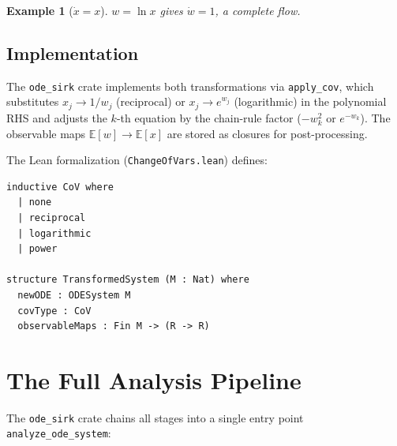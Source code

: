 \documentclass[11pt,a4paper]{article}
\newtheorem{example}{Example}
\newcommand{\Eset}{\mathbb{E}}
\begin{document}
\begin{example}[$\dot{x}=x$]
$w=\ln x$ gives $\dot{w}=1$, a complete flow.
\end{example}

\subsection{Implementation}

The \texttt{ode\_sirk} crate implements both transformations via
\texttt{apply\_cov}, which substitutes $x_{j}\to 1/w_{j}$ (reciprocal)
or $x_{j}\to e^{w_{j}}$ (logarithmic) in the polynomial RHS and adjusts
the $k$-th equation by the chain-rule factor ($-w_{k}^{2}$ or
$e^{-w_{k}}$).  The observable maps $\Eset[w]\to\Eset[x]$ are stored as
closures for post-processing.

The Lean formalization (\texttt{ChangeOfVars.lean}) defines:
\begin{lstlisting}[language={},caption={\texttt{ChangeOfVars.lean}}]
inductive CoV where
  | none
  | reciprocal
  | logarithmic
  | power

structure TransformedSystem (M : Nat) where
  newODE : ODESystem M
  covType : CoV
  observableMaps : Fin M -> (R -> R)
\end{lstlisting}

\section{The Full Analysis Pipeline}\label{sec:pipeline}

The \texttt{ode\_sirk} crate chains all stages into a single entry point
\texttt{analyze\_ode\_system}:
\end{document}
